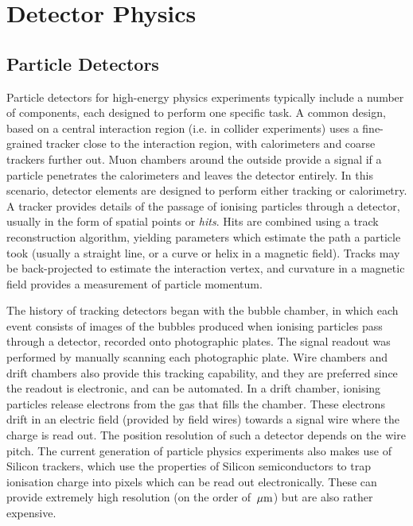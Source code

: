 \chapter{Detector Physics}\label{chapter:DetectorPhysics}
\section{Particle Detectors}
Particle detectors for high-energy physics experiments typically include a number of components, each designed to perform one specific task. A common design, based on a central interaction region (i.e. in collider experiments) uses a fine-grained tracker close to the interaction region, with calorimeters and coarse trackers further out. Muon chambers around the outside provide a signal if a particle penetrates the calorimeters and leaves the detector entirely. In this scenario, detector elements are designed to perform either tracking or calorimetry. A tracker provides details of the passage of ionising particles through a detector, usually in the form of spatial points or \emph{hits}. Hits are combined using a track reconstruction algorithm, yielding parameters which estimate the path a particle took (usually a straight line, or a curve or helix in a magnetic field). Tracks may be back-projected to estimate the interaction vertex, and curvature in a magnetic field provides a measurement of particle momentum\citep{Green2008}. 

The history of tracking detectors began with the bubble chamber, in which each event consists of images of the bubbles produced when ionising particles pass through a detector, recorded onto photographic plates. The signal readout was performed by manually scanning each photographic plate. Wire chambers and drift chambers also provide this tracking capability, and they are preferred since the readout is electronic, and can be automated. In a drift chamber, ionising particles release electrons from the gas that fills the chamber. These electrons drift in an electric field (provided by field wires) towards a signal wire where the charge is read out. The position resolution of such a detector depends on the wire pitch. The current generation of particle physics experiments also makes use of Silicon trackers, which use the properties of Silicon semiconductors to trap ionisation charge into pixels which can be read out electronically. These can provide extremely high resolution (on the order of $\,\mu\mathrm{m}$) but are also rather expensive.

